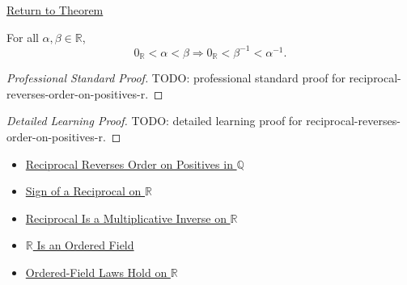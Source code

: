 \newpage
{}
\label{prf:reciprocal-reverses-order-on-positives-r}

\begin{remark*}[Return]
\hyperref[thm:reciprocal-reverses-order-on-positives-r]{Return to Theorem}
\end{remark*}

\begin{theorem*}
For all $\alpha,\beta\in\mathbb{R}$,
\[
0_{\mathbb{R}}<\alpha<\beta
\Longrightarrow
0_{\mathbb{R}}<\beta^{-1}<\alpha^{-1}.
\]
\end{theorem*}

\begin{proof}[Professional Standard Proof]
\LRAProofBodyStart
TODO: professional standard proof for reciprocal-reverses-order-on-positives-r.
\end{proof}

\begin{proof}[Detailed Learning Proof]
\LRAProofBodyStart
TODO: detailed learning proof for reciprocal-reverses-order-on-positives-r.
\end{proof}

\begin{remark*}
\end{remark*}

\begin{dependencies}
\begin{itemize}
  \item \hyperref[thm:reciprocal-reverses-order-on-positives-q]{Reciprocal Reverses Order on Positives in $\mathbb{Q}$}
  \item \hyperref[thm:sign-of-reciprocal-r]{Sign of a Reciprocal on $\mathbb{R}$}
  \item \hyperref[thm:reciprocal-multiplicative-inverse-on-r]{Reciprocal Is a Multiplicative Inverse on $\mathbb{R}$}
  \item \hyperref[thm:r-is-an-ordered-field]{$\mathbb{R}$ Is an Ordered Field}
  \item \hyperref[cor:ordered-field-laws-on-r]{Ordered-Field Laws Hold on $\mathbb{R}$}
\end{itemize}
\end{dependencies}

\clearpage
